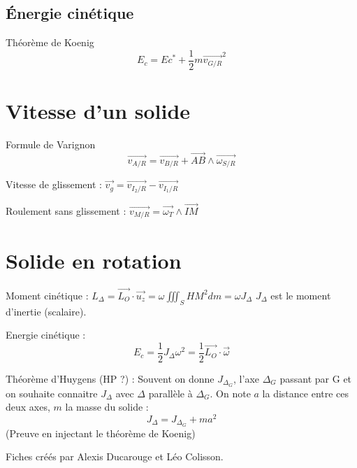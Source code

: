 \documentclass[9pt]{article}
\begin{document}
\begin{multicols*}{2}
\subsection {Énergie cinétique}
Théorème de Koenig
$$E_c = Ec^* + \frac{1}{2}m\overrightarrow{v_{G/R}}^2$$

\section{Vitesse d'un solide}
Formule de Varignon
$$\boxed{\overrightarrow{v_{A/R}} = \overrightarrow{v_{B/R}} + \overrightarrow{AB}\wedge\overrightarrow{\omega_{S/R}}}$$

Vitesse de glissement : $\overrightarrow{v_g} = \overrightarrow{v_{I_2/R}}-\overrightarrow{v_{I_1/R}}$

Roulement sans glissement : $\overrightarrow{v_{M/R}}=\overrightarrow{\omega_T}\wedge\overrightarrow{IM}$


\section{Solide en rotation}
Moment cinétique : $L_\Delta = \overrightarrow{L_O}\cdot\overrightarrow{u_z} = \omega \iiint_S{HM^2dm} = \omega J_\Delta$
$J_\Delta$ est le moment d'inertie (scalaire).

Energie cinétique :
$$\boxed{E_c = \frac{1}{2}J_\Delta\omega^2 = \frac{1}{2}\overrightarrow{L_O}\cdot\overrightarrow{\omega}}$$

Théorème d'Huygens (HP ?) : Souvent on donne $J_{\Delta_G}$, l'axe $\Delta_G$ passant par G et on souhaite connaitre $J_\Delta$ avec $\Delta$ parallèle à $\Delta_G$. On note $a$ la distance entre ces deux axes, $m$ la masse du solide :
$$J_\Delta = J_{\Delta_G} + ma^2$$
(Preuve en injectant le théorème de Koenig)

\footnotesize{Fiches créés par Alexis Ducarouge et Léo Colisson.}
\end{multicols*}
\end{document}
